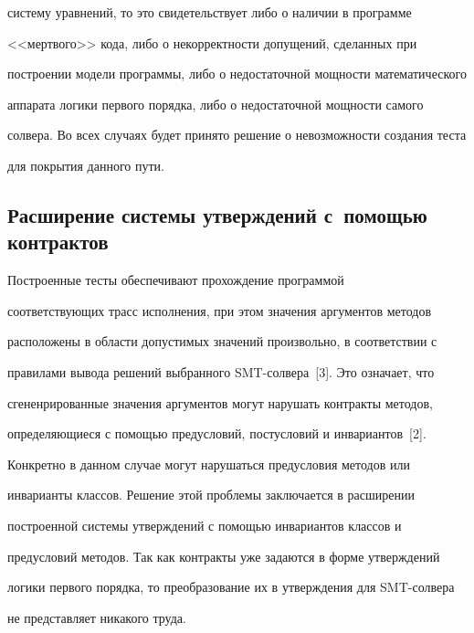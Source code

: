 систему уравнений, то это свидетельствует либо о наличии в программе


<<мертвого>> кода, либо о некорректности допущений, сделанных при


построении модели программы, либо о недостаточной мощности математического


аппарата логики первого порядка, либо о недостаточной мощности самого


солвера. Во всех случаях будет принято решение о невозможности создания теста


для покрытия данного пути.





      \vspace*{-6pt}





      \subsection{Расширение системы утверждений с~помощью контрактов}





     Построенные тесты обеспечивают прохождение программой


соответствующих трасс исполнения, при этом значения аргументов методов


расположены в области допустимых значений произвольно, в соответствии с


правилами вывода решений выбранного SMT-сол\-ве\-ра~[3]. Это означает, что


сгененрированные значения аргументов могут нарушать контракты методов,


определяющиеся с помощью предусловий, постусловий и инвариантов~[2].


Конкретно в данном случае могут нарушаться предусловия методов или


инварианты классов. Решение этой проблемы заключается в расширении


построенной системы утверждений с помощью инвариантов классов и


предусловий методов. Так как контракты уже задаются в форме утверждений


логики первого порядка, то преобразование их в утверждения для SMT-сол\-ве\-ра


не представляет никакого труда.






